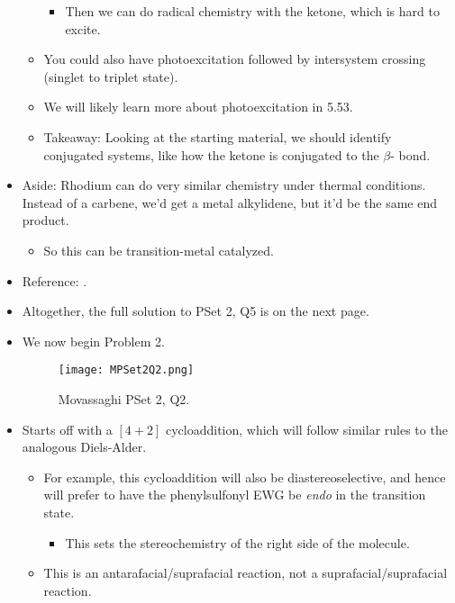 \documentclass[../notes.tex]{subfiles}
\begin{document}
\begin{itemize}
\begin{itemize}
\begin{itemize}
\begin{itemize}
            \end{itemize}
            \item Then we can do radical chemistry with the ketone, which is hard to excite.
        \end{itemize}
        \item You could also have photoexcitation followed by intersystem crossing (singlet to triplet state).
        \item We will likely learn more about photoexcitation in 5.53.
        \item Takeaway: Looking at the starting material, we should identify conjugated systems, like how the ketone is conjugated to the $\beta$- bond.
    \end{itemize}
    \item Aside: Rhodium can do very similar chemistry under thermal conditions. Instead of a carbene, we'd get a metal alkylidene, but it'd be the same end product.
    \begin{itemize}
        \item So this can be transition-metal catalyzed.
    \end{itemize}
    \item Reference: \textcite{bib:PSet2Q5}.
    \item Altogether, the full solution to PSet 2, Q5 is on the next page.
    
    \item We now begin Problem 2.
    \begin{figure}[h!]
        \centering
        \texttt{[image: MPSet2Q2.png]}
        \caption{Movassaghi PSet 2, Q2.}
        \label{fig:MPSet2Q2}
    \end{figure}
    \item Starts off with a $[4+2]$ cycloaddition, which will follow similar rules to the analogous Diels-Alder.
    \begin{itemize}
        \item For example, this cycloaddition will also be diastereoselective, and hence will prefer to have the phenylsulfonyl EWG be \emph{endo} in the transition state.
        \begin{itemize}
            \item This sets the stereochemistry of the right side of the molecule.
        \end{itemize}
        \item This is an antarafacial/suprafacial reaction, not a suprafacial/suprafacial reaction.

\end{itemize}
\end{itemize}
\end{document}

